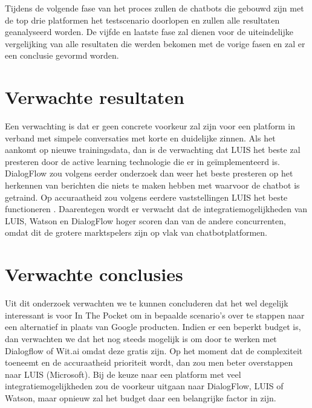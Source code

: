 \bigskip
Tijdens de volgende fase van het proces zullen de chatbots die gebouwd zijn met de top drie platformen het testscenario doorlopen en zullen alle resultaten geanalyseerd worden.
De vijfde en laatste fase zal dienen voor de uiteindelijke vergelijking van alle resultaten die werden bekomen met de vorige fasen en zal er een conclusie gevormd worden.


\section{Verwachte resultaten}
\label{sec:verwachte_resultaten} 

Een verwachting is dat er geen concrete voorkeur zal zijn voor een platform in verband met simpele conversaties met korte en duidelijke zinnen. Als het aankomt op nieuwe trainingsdata, dan is de verwachting dat LUIS het beste zal presteren door de active learning technologie die er in geïmplementeerd is. DialogFlow zou volgens eerder onderzoek dan weer het beste presteren op het herkennen van berichten die niets te maken hebben met waarvoor de chatbot is getraind. Op accuraatheid zou volgens eerdere vaststellingen LUIS het beste functioneren \autocite{Russis2018}. Daarentegen wordt er verwacht dat de integratiemogelijkheden van LUIS, Watson en DialogFlow hoger scoren dan van de andere concurrenten, omdat dit de grotere marktspelers zijn op vlak van chatbotplatformen.

\section{Verwachte conclusies}
\label{sec:verwachte_conclusies}

Uit dit onderzoek verwachten we te kunnen concluderen dat het wel degelijk interessant is voor In The Pocket om in bepaalde scenario’s over te stappen naar een alternatief in plaats van Google producten. Indien er een beperkt budget is, dan verwachten we dat het nog steeds mogelijk is om door te werken met Dialogflow of Wit.ai omdat deze gratis zijn. Op het moment dat de complexiteit toeneemt en de accuraatheid prioriteit wordt, dan zou men beter overstappen naar LUIS (Microsoft). Bij de keuze naar een platform met veel integratiemogelijkheden zou de voorkeur uitgaan naar DialogFlow, LUIS of Watson, maar opnieuw zal het budget daar een belangrijke factor in zijn.

